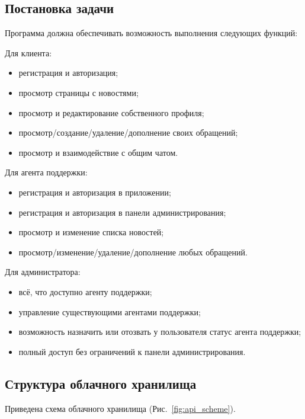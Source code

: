 \documentclass{../includes/TechDoc}
\begin{document}
    \subsection{Постановка задачи}

    Программа должна обеспечивать возможность выполнения следующих функций:

    Для клиента:
    \begin{itemize}[noitemsep]
        \item регистрация и авторизация;
        \item просмотр страницы с новостями;
        \item просмотр и редактирование собственного профиля;
        \item просмотр/создание/удаление/дополнение своих обращений;
        \item просмотр и взаимодействие с общим чатом.
    \end{itemize}

    Для агента поддержки:
    \begin{itemize}[noitemsep]
        \item регистрация и авторизация в приложении;
        \item регистрация и авторизация в панели администрирования;
        \item просмотр и изменение списка новостей;
        \item просмотр/изменение/удаление/дополнение любых обращений.
    \end{itemize}

    Для администратора:
    \begin{itemize}[noitemsep]
        \item всё, что доступно агенту поддержки;
        \item управление существующими агентами поддержки;
        \item возможность назначить или отозвать у пользователя статус агента поддержки;
        \item полный доступ без ограничений к панели администрирования.
    \end{itemize}

    \newpage

    \subsection{Структура облачного хранилища}

    Приведена схема облачного хранилища (Рис.~\ref{fig:api_scheme}).
\end{document}
